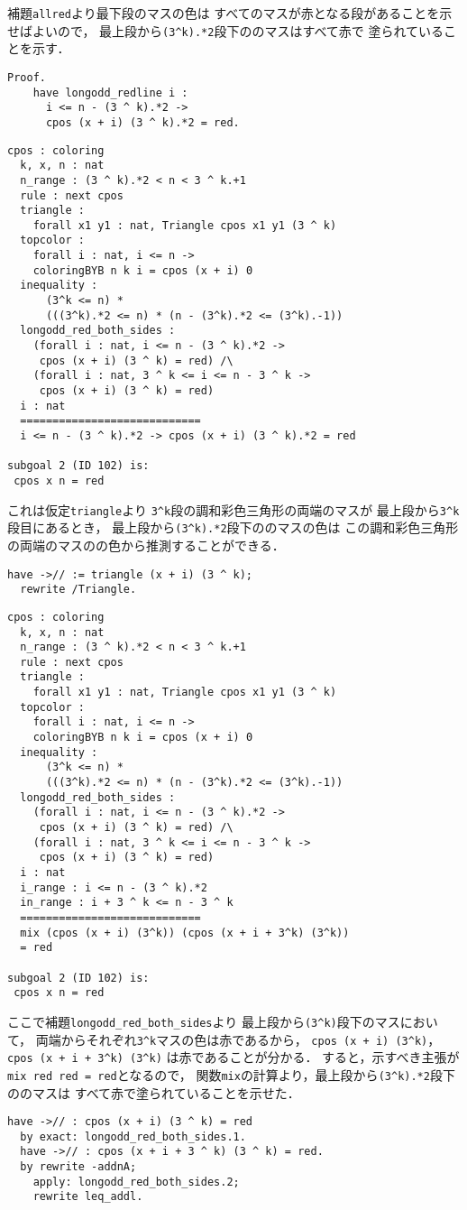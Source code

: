 補題{\tt{allred}}より最下段のマスの色は
すべてのマスが赤となる段があることを示せばよいので，
最上段から{\tt{(3\verb|^|k).*2}}段下ののマスはすべて赤で
塗られていることを示す．
\begin{lstlisting}[language=Coq]
  Proof.
    have longodd_redline i :
      i <= n - (3 ^ k).*2 ->
      cpos (x + i) (3 ^ k).*2 = red.
\end{lstlisting}
\begin{lstlisting}[language=Coq]
  cpos : coloring
  k, x, n : nat
  n_range : (3 ^ k).*2 < n < 3 ^ k.+1
  rule : next cpos
  triangle :
    forall x1 y1 : nat, Triangle cpos x1 y1 (3 ^ k)
  topcolor :
    forall i : nat, i <= n ->
    coloringBYB n k i = cpos (x + i) 0
  inequality :
      (3^k <= n) *
      (((3^k).*2 <= n) * (n - (3^k).*2 <= (3^k).-1))
  longodd_red_both_sides :
    (forall i : nat, i <= n - (3 ^ k).*2 ->
     cpos (x + i) (3 ^ k) = red) /\
    (forall i : nat, 3 ^ k <= i <= n - 3 ^ k ->
     cpos (x + i) (3 ^ k) = red)
  i : nat
  ============================
  i <= n - (3 ^ k).*2 -> cpos (x + i) (3 ^ k).*2 = red

subgoal 2 (ID 102) is:
 cpos x n = red
\end{lstlisting}
これは仮定{\tt{triangle}}より
{\tt{3\verb|^|k}}段の調和彩色三角形の両端のマスが
最上段から{\tt{3\verb|^|k}}段目にあるとき，
最上段から{\tt{(3\verb|^|k).*2}}段下ののマスの色は
この調和彩色三角形の両端のマスのの色から推測することができる．
\begin{lstlisting}[language=Coq]
  have ->// := triangle (x + i) (3 ^ k);
  rewrite /Triangle. 
\end{lstlisting}
\begin{lstlisting}[language=Coq]
  cpos : coloring
  k, x, n : nat
  n_range : (3 ^ k).*2 < n < 3 ^ k.+1
  rule : next cpos
  triangle :
    forall x1 y1 : nat, Triangle cpos x1 y1 (3 ^ k)
  topcolor :
    forall i : nat, i <= n ->
    coloringBYB n k i = cpos (x + i) 0
  inequality :
      (3^k <= n) *
      (((3^k).*2 <= n) * (n - (3^k).*2 <= (3^k).-1))
  longodd_red_both_sides :
    (forall i : nat, i <= n - (3 ^ k).*2 ->
     cpos (x + i) (3 ^ k) = red) /\
    (forall i : nat, 3 ^ k <= i <= n - 3 ^ k ->
     cpos (x + i) (3 ^ k) = red)
  i : nat
  i_range : i <= n - (3 ^ k).*2
  in_range : i + 3 ^ k <= n - 3 ^ k
  ============================
  mix (cpos (x + i) (3^k)) (cpos (x + i + 3^k) (3^k))
  = red

subgoal 2 (ID 102) is:
 cpos x n = red
\end{lstlisting}
ここで補題{\tt{longodd\_red\_both\_sides}}より
最上段から{\tt{(3\verb|^|k)}}段下のマスにおいて，
両端からそれぞれ{\tt{3\verb|^|k}}マスの色は赤であるから，
{\tt{cpos (x + i) (3\verb|^|k)}}，
{\tt{cpos (x + i + 3\verb|^|k) (3\verb|^|k)}}
は赤であることが分かる．
すると，示すべき主張が{\tt{mix red red = red}}となるので，
関数{\tt{mix}}の計算より，最上段から{\tt{(3\verb|^|k).*2}}段下ののマスは
すべて赤で塗られていることを示せた．
\begin{lstlisting}[language=Coq]
  have ->// : cpos (x + i) (3 ^ k) = red
  by exact: longodd_red_both_sides.1.
  have ->// : cpos (x + i + 3 ^ k) (3 ^ k) = red.
  by rewrite -addnA;
    apply: longodd_red_both_sides.2;
    rewrite leq_addl.
\end{lstlisting}

